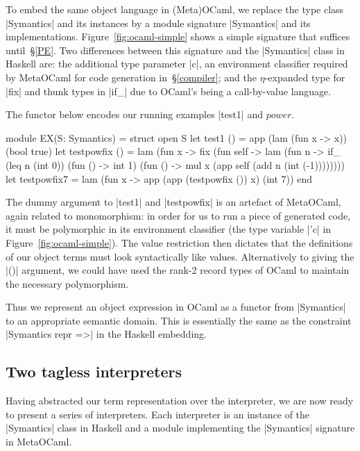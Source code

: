 \documentclass[preprint]{sigplanconf}
\begin{document}
To embed the same object language in (Meta)OCaml, we replace the type
class |Symantics| and its instances by a module signature |Symantics|
and its implementations.  Figure~\ref{fig:ocaml-simple} shows a simple
signature that suffices until~\S\ref{PE}.
Two differences between this signature and the |Symantics| class in
Haskell are: the additional type parameter |c|, an
environment classifier \citep{WalidPOPL03} required by MetaOCaml for
code generation in~\S\ref{compiler}; and the $\eta$-expanded type for
|fix| and thunk types in |if_| due to OCaml's being a call-by-value
language.

The functor below encodes our running examples |test1| and $\mathit{power}$.
\begin{code}
module EX(S: Symantics) = struct
  open S
  let test1 () =
    app (lam (fun x -> x)) (bool true)
  let testpowfix () = 
    lam (fun x -> fix (fun self -> lam (fun n ->
    if_ (leq n (int 0)) (fun () -> int 1)
        (fun () -> mul x
          (app self (add n (int (-1))))))))
  let testpowfix7 = 
     lam (fun x -> app (app (testpowfix ()) x)
                       (int 7))
end
\end{code}
The dummy argument to |test1| and |testpowfix| is an artefact of
MetaOCaml, again related to monomorphism: in order for us to run a
piece of generated code, it must be polymorphic in its environment
classifier (the type variable |'c| in Figure~\ref{fig:ocaml-simple}).
The value restriction then dictates that
the definitions of our object terms must look syntactically like
values. Alternatively to giving the |()| argument, we could have used
the rank-2 record types of OCaml to maintain the necessary polymorphism.

Thus we represent an object expression in
OCaml as a functor from |Symantics| to an appropriate semantic domain. This
is essentially the same as the constraint |Symantics repr =>| in the
Haskell embedding.

\subsection{Two tagless interpreters}
\label{S:interpreter-RL}

Having abstracted our term representation over the interpreter, we are
now ready to present a series of interpreters.  Each interpreter is an
instance of the |Symantics| class in Haskell and a module implementing
the |Symantics| signature in MetaOCaml.
\end{document}

